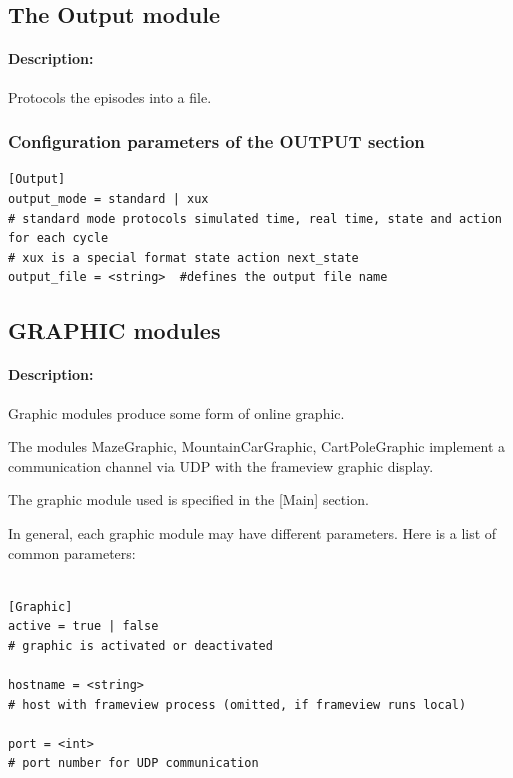 \documentclass[a4paper,12pt,german]{article}
\begin{document}
\subsection{The Output module}

\paragraph{Description:} Protocols the episodes into a file.

\subsubsection{Configuration parameters of the OUTPUT section}

\begin{footnotesize}
\begin{verbatim}
[Output]
output_mode = standard | xux 
# standard mode protocols simulated time, real time, state and action for each cycle
# xux is a special format state action next_state
output_file = <string>  #defines the output file name
\end{verbatim}
\end{footnotesize}

\subsection{GRAPHIC modules}

\paragraph{Description:} Graphic modules produce some form of online graphic.

The modules MazeGraphic, MountainCarGraphic, CartPoleGraphic implement a communication channel
via UDP with the frameview graphic display.

The graphic module used is specified in the [Main] section.

In general, each graphic module may have different parameters. Here is a list of common
parameters:
\begin{footnotesize}
\begin{verbatim}

[Graphic]
active = true | false
# graphic is activated or deactivated

hostname = <string>
# host with frameview process (omitted, if frameview runs local)

port = <int>
# port number for UDP communication

\end{verbatim}
\end{footnotesize}
\end{document}
